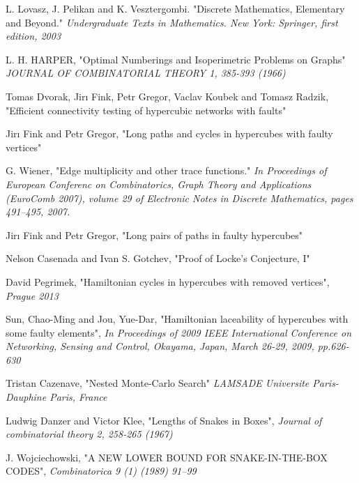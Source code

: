 \documentclass{pracamgr}
\begin{document}
 
  
  
\begin{thebibliography}{99}%

   L. Lovasz, J. Pelikan and K. Vesztergombi.
   "Discrete Mathematics, Elementary and Beyond."
   \textit{Undergraduate Texts in Mathematics. New York: Springer, first edition, 2003}   

   L. H. HARPER,
   "Optimal Numberings and Isoperimetric Problems on Graphs"
   \textit{JOURNAL OF COMBINATORIAL THEORY 1, 385-393 (1966)}
   
   Tomas Dvorak, Jirı Fink, Petr Gregor, Vaclav Koubek and Tomasz Radzik,
   "Efficient connectivity testing of hypercubic networks with faults"
   
   Jirı Fink and Petr Gregor,
   "Long paths and cycles in hypercubes with faulty vertices"
   
   G. Wiener,
   "Edge multiplicity and other trace functions."
   \textit{In Proceedings of European Conferenc on Combinatorics, Graph Theory and Applications (EuroComb 2007), volume 29 of
   Electronic Notes in Discrete Mathematics, pages 491–495, 2007.}
   
   Jirı Fink and Petr Gregor,
   "Long pairs of paths in faulty hypercubes"
  
   Nelson Casenada and Ivan S. Gotchev,
   "Proof of Locke's Conjecture, I"

   David Pegrimek,
   "Hamiltonian cycles in hypercubes with removed vertices",
   \textit{Prague 2013}
  
  Sun, Chao-Ming and Jou, Yue-Dar,
   "Hamiltonian laceability of hypercubes with some faulty elements",
   \textit{In Proceedings of 2009 IEEE International Conference on Networking, Sensing and Control, Okayama, Japan,
   March 26-29, 2009, pp.626-630}
  
   Tristan Cazenave,
   "Nested Monte-Carlo Search"
   \textit{LAMSADE Universite Paris-Dauphine Paris, France}  
  
   Ludwig Danzer and Victor Klee,
   "Lengths of Snakes in Boxes",
   \textit{Journal of combinatorial theory 2, 258-265 (1967)}

   J. Wojciechowski,
   "A NEW LOWER BOUND FOR SNAKE-IN-THE-BOX CODES",
   \textit{Combinatorica 9 (1) (1989) 91--99}
  

\end{thebibliography}
\end{document}
